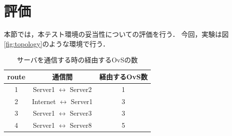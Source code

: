 \documentclass[submit,techrep]{ipsj}
\begin{document}
\section{評価}

本節では，本テスト環境の妥当性についての評価を行う．
今回，実験は図\ref{fig:topology}のような環境で行う．
\begin{table}[tb]
	\centering
	\caption{サーバを通信する時の経由するOvSの数}
	\label{tab:route}
	\vspace{4mm}
	{
		\begin{tabular}{ c c c } \hline
      route & 通信間 & 経由するOvS数 \\ \hline \hline
      1 & Server1 $\longleftrightarrow$	Server2 & 1 \\ \hline
      2 & Internet $\longleftrightarrow$ Server1 & 3 \\ \hline
      3 & Server1 $\longleftrightarrow$	Server3 & 3 \\ \hline
      4 & Server1 $\longleftrightarrow$	Server8 & 5 \\ \hline
		\end{tabular}
	}
\end{table}
\end{document}
